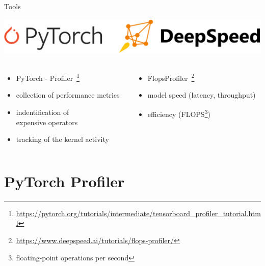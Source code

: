 \documentclass[compress,aspectratio=169]{beamer}
\begin{document}
\begin{frame}[t]{Tools}
    \begin{center}
        \includegraphics[width=1\textwidth]{./assets/tools}
    \end{center}
    \begin{columns}[t]
    \begin{column}{0.5\textwidth}
                \begin{itemize}
                    \item PyTorch - Profiler~\footnote{\tiny{\url{https://pytorch.org/tutorials/intermediate/tensorboard_profiler_tutorial.html}}}
                    \item collection of performance metrics
                    \item indentification of\\expensive operators
                    \item tracking of the kernel activity
                \end{itemize}
    \end{column}
    \begin{column}{0.5\textwidth}
                \begin{itemize}
                    \item FlopsProfiler~\footnote{\tiny{\url{https://www.deepspeed.ai/tutorials/flops-profiler/}}}
                    \item model speed (latency, throughput)
                    \item efficiency (FLOPS\footnote{\tiny{floating-point operations per second}})
                \end{itemize}
    \end{column}
    \end{columns}
\end{frame}

\section{PyTorch Profiler}
\sectionIntroHidden
\end{document}
